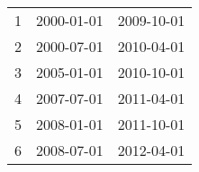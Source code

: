 % 
\begin{tabular}{ccc}
  \hline
  \hline
1 & 2000-01-01 & 2009-10-01 \\ 
  2 & 2000-07-01 & 2010-04-01 \\ 
  3 & 2005-01-01 & 2010-10-01 \\ 
  4 & 2007-07-01 & 2011-04-01 \\ 
  5 & 2008-01-01 & 2011-10-01 \\ 
  6 & 2008-07-01 & 2012-04-01 \\ 
   \hline
\end{tabular}
